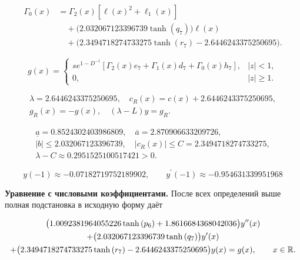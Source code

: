 \begin{equation}
\begin{aligned}\Gamma_0(x)&=\Gamma_2(x)[\ell(x)^2+\ell_1(x)]\\&\quad+\bigl(2.032067123396739 \tanh{\left(q_{7} \right)}\bigr)\ell(x)\\&\quad+\bigl(2.3494718274733275 \tanh{\left(r_{7} \right)} - 2.6446243375250695\bigr).\end{aligned}
\end{equation}


\begin{equation}\label{eq:ex4-forcing}
g(x)=\begin{cases}s e^{1-D^{-1}}[\Gamma_2(x)e_{7}+\Gamma_1(x)d_{7}+\Gamma_0(x)h_{7}],&|z|<1,\\0,&|z|\ge1.\end{cases}
\end{equation}


\begin{equation}
\begin{aligned}\lambda=2.6446243375250695,\quad c_R(x)=c(x)+2.6446243375250695,\\g_R(x)=-g(x),\quad (\lambda-L)y=g_R.\end{aligned}
\end{equation}


\begin{equation}
\begin{aligned}\underline a=0.8524302403986809,\quad \overline a=2.870906633209726,\\|b|\le2.032067123396739,\quad |c_R(x)|\le C=2.3494718274733275,\\\lambda-C\approx0.2951525100517421>0.\end{aligned}
\end{equation}


\begin{equation}
y(-1)\approx-0.07182719752189902,\qquad y^\prime(-1)\approx-0.954631339951968
\end{equation}


\noindent\textbf{Уравнение с числовыми коэффициентами.} После всех определений выше полная подстановка в исходную форму даёт

\begin{multline}\label{eq:ex4-ode}\bigl(1.0092381964055226 \tanh{\left(p_{6} \right)} + 1.8616684368042036\bigr)y^{\prime\prime}(x)\\+\bigl(2.032067123396739 \tanh{\left(q_{7} \right)}\bigr)y^\prime(x)\\+\bigl(2.3494718274733275 \tanh{\left(r_{7} \right)} - 2.6446243375250695\bigr)y(x)=g(x),\qquad x\in\mathbb R.\end{multline}

